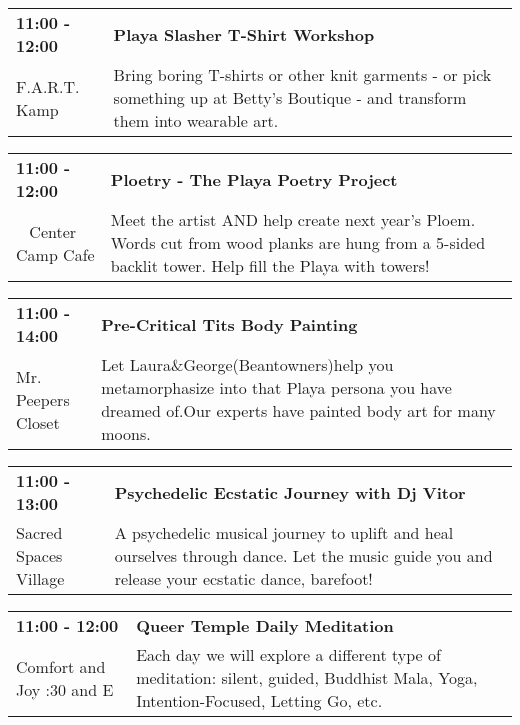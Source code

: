\begin{tabular}{ p{1in} p{2.2in} }
    \textbf{11:00 - 12:00} & \textbf{Playa Slasher T-Shirt Workshop} \\
    F.A.R.T. Kamp \newline  & Bring boring T-shirts or other knit garments - or pick something up at Betty's Boutique - and transform them into wearable art. \\
    \hline 
\end{tabular}
    
\begin{tabular}{ p{1in} p{2.2in} }
    \textbf{11:00 - 12:00} & \textbf{Ploetry - The Playa Poetry Project} \\
    ~ \newline Center Camp Cafe & Meet the artist AND help create next year's Ploem. Words cut from wood planks are hung from a 5-sided backlit tower. Help fill the Playa with towers! \\
    \hline 
\end{tabular}
    
\begin{tabular}{ p{1in} p{2.2in} }
    \textbf{11:00 - 14:00} & \textbf{Pre-Critical Tits Body Painting} \\
    Mr. Peepers Closet \newline  & Let Laura\&George(Beantowners)help you metamorphasize into that Playa persona you have dreamed of.Our experts have painted body art for many moons. \\
    \hline 
\end{tabular}
    
\begin{tabular}{ p{1in} p{2.2in} }
    \textbf{11:00 - 13:00} & \textbf{Psychedelic Ecstatic Journey with Dj Vitor} \\
    Sacred Spaces Village \newline  & A psychedelic musical journey to uplift and heal ourselves through dance. Let the music guide you and release your ecstatic dance, barefoot! \\
    \hline 
\end{tabular}
    
\begin{tabular}{ p{1in} p{2.2in} }
    \textbf{11:00 - 12:00} & \textbf{Queer Temple Daily Meditation} \\
    Comfort and Joy \newline 7:30 and E & Each day we will explore a different type of meditation: silent, guided, Buddhist Mala, Yoga, Intention-Focused, Letting Go, etc. \\
    \hline 
\end{tabular}
    
